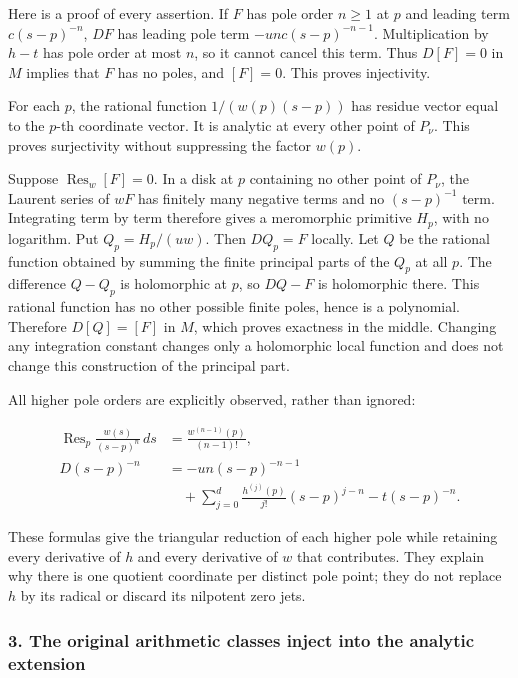 Here is a proof of every assertion. If \(F\) has pole order \(n\geq1\) at \(p\) and leading term \(c(s-p)^{-n}\), \(D F\) has leading pole term \(-u n c(s-p)^{-n-1}\). Multiplication by \(h-t\) has pole order at most \(n\), so it cannot cancel this term. Thus \(D[F]=0\) in \(M\) implies that \(F\) has no poles, and \([F]=0\). This proves injectivity.

For each \(p\), the rational function \(1/(w(p)(s-p))\) has residue vector equal to the \(p\)-th coordinate vector. It is analytic at every other point of \(P_{\nu}\). This proves surjectivity without suppressing the factor \(w(p)\).

Suppose \(\operatorname{Res}_w[F]=0\). In a disk at \(p\) containing no other point of \(P_{\nu}\), the Laurent series of \(wF\) has finitely many negative terms and no \((s-p)^{-1}\) term. Integrating term by term therefore gives a meromorphic primitive \(H_p\), with no logarithm. Put \(Q_p=H_p/(u w)\). Then \(D Q_p=F\) locally. Let \(Q\) be the rational function obtained by summing the finite principal parts of the \(Q_p\) at all \(p\). The difference \(Q-Q_p\) is holomorphic at \(p\), so \(DQ-F\) is holomorphic there. This rational function has no other possible finite poles, hence is a polynomial. Therefore \(D[Q]=[F]\) in \(M\), which proves exactness in the middle. Changing any integration constant changes only a holomorphic local function and does not change this construction of the principal part.

All higher pole orders are explicitly observed, rather than ignored:

\[
\begin{aligned}
\operatorname{Res}_p\frac{w(s)}{(s-p)^n}\,ds
&=\frac{w^{(n-1)}(p)}{(n-1)!},\\
D(s-p)^{-n}&=-u n(s-p)^{-n-1}\\
&\quad+\sum_{j=0}^d\frac{h^{(j)}(p)}{j!}(s-p)^{j-n}
-t(s-p)^{-n}.
\end{aligned}
\tag{AP4}
\]

These formulas give the triangular reduction of each higher pole while retaining every derivative of \(h\) and every derivative of \(w\) that contributes. They explain why there is one quotient coordinate per distinct pole point; they do not replace \(h\) by its radical or discard its nilpotent zero jets.

\subsubsection{3. The original arithmetic classes inject into the analytic extension}\label{endpoint-analytic_pole--the-original-arithmetic-classes-inject-into-the-analytic-extension}

